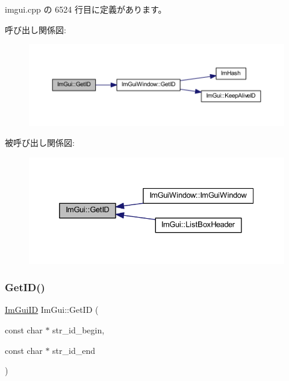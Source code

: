  imgui.\+cpp の 6524 行目に定義があります。

呼び出し関係図\+:\nopagebreak
\begin{figure}[H]
\begin{center}
\leavevmode
\includegraphics[width=350pt]{namespace_im_gui_a3329b04bd4235e90ad9deb00ffb38ae4_cgraph}
\end{center}
\end{figure}
被呼び出し関係図\+:\nopagebreak
\begin{figure}[H]
\begin{center}
\leavevmode
\includegraphics[width=332pt]{namespace_im_gui_a3329b04bd4235e90ad9deb00ffb38ae4_icgraph}
\end{center}
\end{figure}
\mbox{\label{namespace_im_gui_a26064d74efebef3aa86e1a78b3e4c333}} 
\subsubsection{\texorpdfstring{Get\+I\+D()}{GetID()}\hspace{0.1cm}{\footnotesize\ttfamily [2/3]}}
{\footnotesize\ttfamily \mbox{\hyperlink{imgui_8h_a1785c9b6f4e16406764a85f32582236f}{Im\+Gui\+ID}} Im\+Gui\+::\+Get\+ID (\begin{DoxyParamCaption}\item[{const char $\ast$}]{str\+\_\+id\+\_\+begin,  }\item[{const char $\ast$}]{str\+\_\+id\+\_\+end }\end{DoxyParamCaption})}



